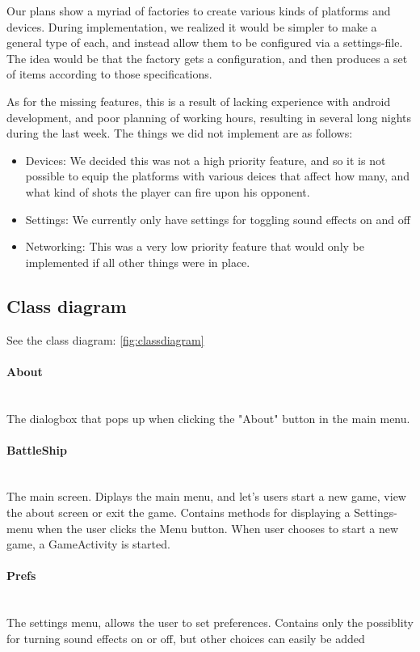 \documentclass[12pt, a4paper]{article}
\begin{document}
Our plans show a myriad of factories to create various kinds of platforms and
devices. During implementation, we realized it would be simpler to make a
general type of each, and instead allow them to be configured via a
settings-file. The idea would be that the factory gets a configuration, and then
produces a set of items according to those specifications.

As for the missing features, this is a result of lacking experience with android
development, and poor planning of working hours, resulting in several long
nights during the last week. The things we did not implement are as follows:

\begin{itemize}
	\item Devices: 
		\subitem We decided this was not a high priority feature, and so it is
not possible to equip the platforms with various deices that affect how many, and what kind of
shots the player can fire upon his opponent.
	\item Settings:
		\subitem We currently only have settings for toggling sound effects on and off
	\item Networking: 
		\subitem This was a very low priority feature that would only be implemented if all other
things were in place.
\end{itemize}

\subsection{Class diagram}
See the class diagram: \ref{fig:classdiagram}

\paragraph{About} ~\\
	The dialogbox that pops up when clicking the "About" button in the main menu.

\paragraph{BattleShip} ~\\
	The main screen. Diplays the main menu, and let's users start a new game, view the about screen or exit the game. Contains methods for displaying a Settings-menu when the user clicks the Menu button.
When user chooses to start a new game, a GameActivity is started.

\paragraph{Prefs}  ~\\
	The settings menu, allows the user to set preferences. Contains only the possiblity for turning sound effects on or off, but other choices can easily be added
\end{document}
